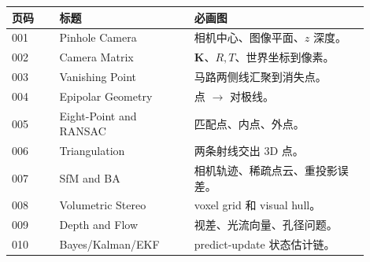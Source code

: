 \documentclass[11pt]{article}
\newcommand{\K}{\mathbf{K}}
\begin{document}
\begin{center}
\begin{tabular}{p{0.12\linewidth}p{0.34\linewidth}p{0.44\linewidth}}
\toprule
页码 & 标题 & 必画图 \\
\midrule
001 & Pinhole Camera & 相机中心、图像平面、$z$ 深度。 \\
002 & Camera Matrix & $\K$、$R,T$、世界坐标到像素。 \\
003 & Vanishing Point & 马路两侧线汇聚到消失点。 \\
004 & Epipolar Geometry & 点 $\rightarrow$ 对极线。 \\
005 & Eight-Point and RANSAC & 匹配点、内点、外点。 \\
006 & Triangulation & 两条射线交出 3D 点。 \\
007 & SfM and BA & 相机轨迹、稀疏点云、重投影误差。 \\
008 & Volumetric Stereo & voxel grid 和 visual hull。 \\
009 & Depth and Flow & 视差、光流向量、孔径问题。 \\
010 & Bayes/Kalman/EKF & predict-update 状态估计链。 \\
\bottomrule
\end{tabular}
\end{center}
\end{document}
